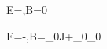 \nabla\cdot\mathbf E=\frac{},\qquad\nabla\cdot\mathbf B=0

\nabla\times\mathbf E=-,\qquad\nabla\times\mathbf B=\mu_0\mathbf J+\mu_0\varepsilon_0
